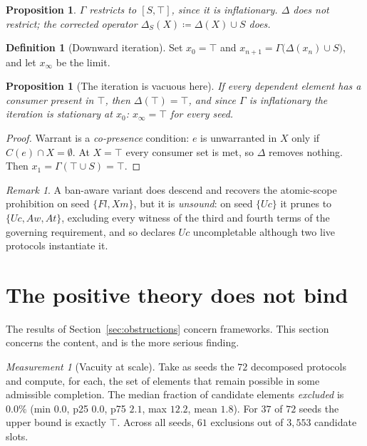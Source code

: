 \documentclass[11pt,reqno]{amsart}
\theoremstyle{plain}
\newtheorem{proposition}[theorem]{Proposition}
\theoremstyle{definition}
\newtheorem{definition}[theorem]{Definition}
\theoremstyle{remark}
\newtheorem{measurement}[theorem]{Measurement}
\newtheorem{remark}[theorem]{Remark}
\begin{document}
\begin{proposition}
$\Gamma$ restricts to $[S,\top]$, since it is inflationary. $\Delta$ does not
restrict; the corrected operator $\Delta_S(X) \coloneqq \Delta(X) \cup S$ does.
\end{proposition}

\begin{definition}[Downward iteration]
Set $x_0 = \top$ and $x_{n+1} = \Gamma\bigl(\Delta(x_n) \cup S\bigr)$, and let
$x_\infty$ be the limit.
\end{definition}

\begin{proposition}[The iteration is vacuous here]\label{prop:vacuous}
If every dependent element has a consumer present in $\top$, then
$\Delta(\top) = \top$, and since $\Gamma$ is inflationary the iteration is
stationary at $x_0$: $x_\infty = \top$ for every seed.
\end{proposition}

\begin{proof}
Warrant is a \emph{co-presence} condition: $e$ is unwarranted in $X$ only if
$C(e) \cap X = \emptyset$. At $X = \top$ every consumer set is met, so $\Delta$
removes nothing. Then $x_1 = \Gamma(\top \cup S) = \top$.
\end{proof}

\begin{remark}
A ban-aware variant does descend and recovers the atomic-scope prohibition on
seed $\{Fl,Xm\}$, but it is \emph{unsound}: on seed $\{Uc\}$ it prunes to
$\{Uc,Aw,At\}$, excluding every witness of the third and fourth terms of the
governing requirement, and so declares $Uc$ uncompletable although two live
protocols instantiate it. 
\end{remark}

\section{The positive theory does not bind}\label{sec:vacuity}

The results of Section~\ref{sec:obstructions} concern frameworks. This section
concerns the content, and is the more serious finding.

\begin{measurement}[Vacuity at scale]\label{meas:vacuous58}
Take as seeds the $72$ decomposed protocols and compute, for each, the set of
elements that remain possible in some admissible completion. The median fraction
of candidate elements \emph{excluded} is $0.0\%$ (min $0.0$, p25 $0.0$, p75
$2.1$, max $12.2$, mean $1.8$). For $37$ of $72$ seeds the upper bound is exactly
$\top$. Across all seeds, $61$ exclusions out of $3{,}553$ candidate slots.
\end{measurement}
\end{document}
